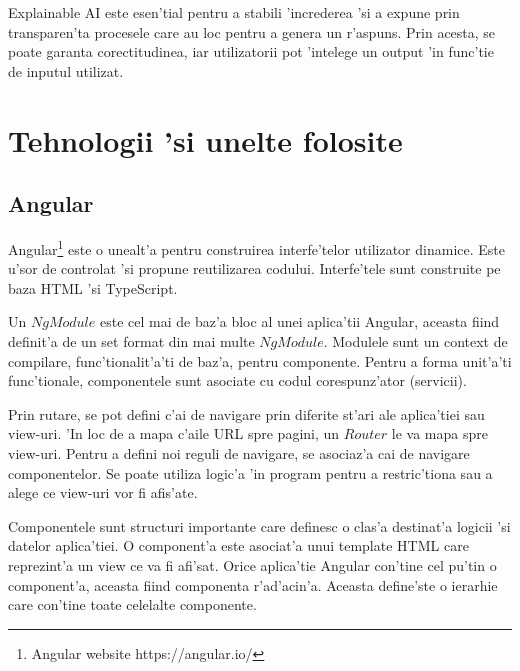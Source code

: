 \documentclass[12pt,a4paper,twoside]{report}
\begin{document}
Explainable AI este esen'tial pentru a stabili 'increderea 'si a expune prin transparen'ta procesele care au loc pentru a genera un r'aspuns. Prin acesta, se poate garanta corectitudinea, iar utilizatorii pot 'intelege un output 'in func'tie de inputul utilizat.

\section{Tehnologii 'si unelte folosite}
\subsection{Angular}

Angular\footnote{Angular website https://angular.io/} este o unealt'a pentru construirea interfe'telor utilizator dinamice. Este u'sor de controlat 'si propune reutilizarea codului. Interfe'tele sunt construite pe baza HTML 'si TypeScript. 





Un $NgModule$ este cel mai de baz'a bloc al unei aplica'tii Angular, aceasta fiind definit'a de un set format din mai multe $NgModule$. Modulele sunt un context de compilare, func'tionalit'a'ti de baz'a, pentru componente. Pentru a forma unit'a'ti func'tionale, componentele sunt asociate cu codul corespunz'ator (servicii).

Prin rutare, se pot defini c'ai de navigare prin diferite st'ari ale aplica'tiei sau view-uri. 'In loc de a mapa c'aile URL spre pagini, un $Router$ le va mapa spre view-uri. Pentru a defini noi reguli de navigare, se asociaz'a cai de navigare componentelor. Se poate utiliza logic'a 'in program pentru a restric'tiona sau a alege ce view-uri vor fi afis'ate.

Componentele sunt structuri importante care definesc o clas'a destinat'a logicii 'si datelor aplica'tiei. O component'a este asociat'a unui template HTML care reprezint'a un view ce va fi afi'sat. Orice aplica'tie Angular con'tine cel pu'tin o component'a, aceasta fiind componenta r'ad'acin'a. Aceasta define'ste o ierarhie care con'tine toate celelalte componente.
\end{document}
